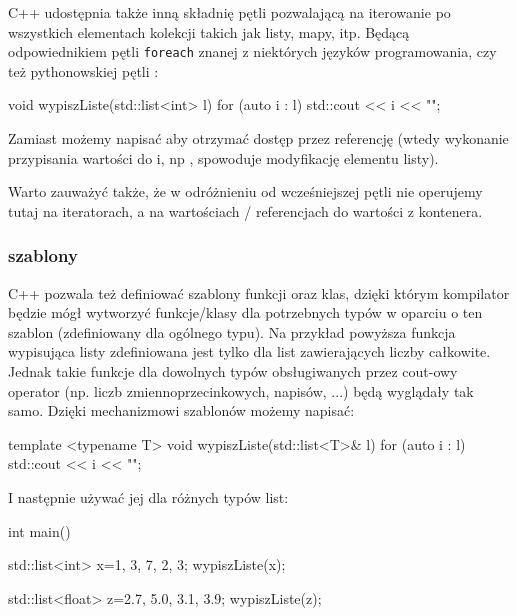 C++ udostępnia także inną składnię pętli  pozwalającą na iterowanie po wszystkich elementach kolekcji takich jak listy, mapy, itp. Będącą odpowiednikiem pętli \Verb#foreach# znanej z niektórych języków programowania, czy też pythonowskiej pętli :

\begin{CodeFrame*}[cpp]{}
void wypiszListe(std::list<int> l) {
    for (auto i : l) {
        std::cout << i << "\n";
    }
}
\end{CodeFrame*}

Zamiast  możemy napisać  aby otrzymać dostęp przez referencję (wtedy wykonanie przypisania wartości do i, np , spowoduje modyfikację elementu listy).

Warto zauważyć także, że w odróżnieniu od wcześniejszej pętli nie operujemy tutaj na iteratorach, a na wartościach / referencjach do wartości z kontenera.

\subsubsection{szablony}

C++ pozwala też definiować szablony funkcji oraz klas, dzięki którym kompilator będzie mógł wytworzyć funkcje/klasy dla potrzebnych typów w oparciu o ten szablon (zdefiniowany dla ogólnego typu).
Na przykład powyższa funkcja wypisująca listy zdefiniowana jest tylko dla list zawierających liczby całkowite.
Jednak takie funkcje dla dowolnych typów obsługiwanych przez cout-owy operator \cpp{<<} (np. liczb zmiennoprzecinkowych, napisów, ...) będą wyglądały tak samo.
Dzięki mechanizmowi szablonów możemy napisać:

\begin{CodeFrame*}[cpp]{}
template <typename T> void wypiszListe(std::list<T>& l) {
    for (auto i : l) {
        std::cout << i << "\n";
    }
}
\end{CodeFrame*}

I następnie używać jej dla różnych typów list:

\begin{CodeFrame*}[cpp]{}
int main() {
    std::list<int> x={1, 3, 7, 2, 3};
    wypiszListe(x);
    
    std::list<float> z={2.7, 5.0, 3.1, 3.9};
    wypiszListe(z);
}
\end{CodeFrame*}


